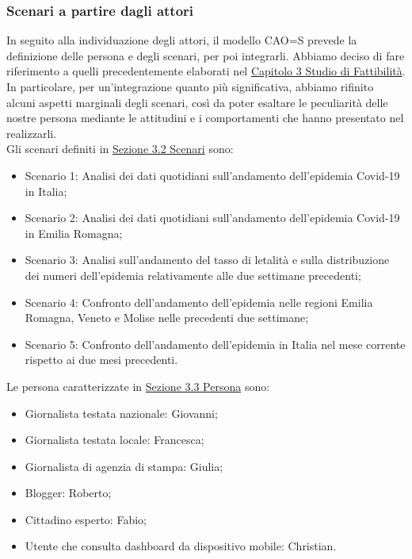 \noindent
\subsubsection{Scenari a partire dagli attori}
\label{sss:scenari-a-partire-da-attori}
In seguito alla individuazione degli attori, il modello CAO=S prevede la definizione delle persona e degli scenari, per poi integrarli.
Abbiamo deciso di fare riferimento a quelli precedentemente elaborati nel \hyperref[c:studio-fattibilita]{Capitolo 3 Studio di Fattibilità}.
In particolare, per un'integrazione quanto più significativa, abbiamo rifinito alcuni aspetti marginali degli scenari, così da poter esaltare le peculiarità delle nostre persona mediante le attitudini e i comportamenti che hanno presentato nel realizzarli.\\
Gli scenari definiti in \hyperref[s:scenari]{Sezione 3.2 Scenari} sono:
\begin{itemize}
    \item Scenario 1: Analisi dei dati quotidiani sull'andamento dell'epidemia Covid-19 in Italia;
    \item Scenario 2: Analisi dei dati quotidiani sull'andamento dell'epidemia Covid-19 in Emilia Romagna;
    \item Scenario 3: Analisi sull'andamento del tasso di letalità e sulla distribuzione dei numeri dell'epidemia relativamente alle due settimane precedenti;
    \item Scenario 4: Confronto dell'andamento dell'epidemia nelle regioni Emilia Romagna, Veneto e Molise nelle precedenti due settimane;
    \item Scenario 5: Confronto dell'andamento dell'epidemia in Italia nel mese corrente rispetto ai due mesi precedenti.
\end{itemize}
Le persona caratterizzate in \hyperref[s:persona]{Sezione 3.3 Persona} sono:
\begin{itemize}
    \item Giornalista testata nazionale: Giovanni;
    \item Giornalista testata locale: Francesca;
    \item Giornalista di agenzia di stampa: Giulia;
    \item Blogger: Roberto;
    \item Cittadino esperto: Fabio;
    \item Utente che consulta dashboard da dispositivo mobile: Christian.
\end{itemize}
\noindent
